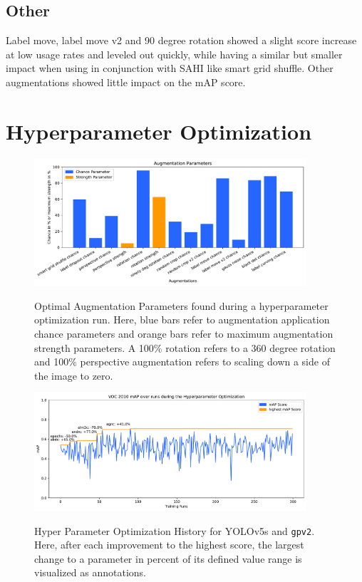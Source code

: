 \documentclass[10pt]{book}
\begin{document}
\subsection{Other} %

Label move, label move v2 and 90 degree rotation showed a slight score increase at low usage rates and leveled out quickly, while having a similar but smaller impact when using in conjunction with \ac{SAHI} like smart grid shuffle. Other augmentations showed little impact on the \ac{mAP} score.

\section{Hyperparameter Optimization}

\begin{figure}
  \caption{Optimal Augmentation Parameters found during a hyperparameter optimization run. Here, blue bars refer to augmentation application chance parameters and orange bars refer to maximum augmentation strength parameters. A 100\% rotation refers to a 360 degree rotation and 100\% perspective augmentation refers to scaling down a side of the image to zero.}
  \includegraphics[width=0.9\textwidth]{plot/best_hyp_run_params}
  \label{fig:optimal_augment_params} 
\end{figure} %

\begin{figure}
  \caption{Hyper Parameter Optimization History for \ac{YOLO}v5s and \texttt{gpv2}. Here, after each improvement to the highest score, the largest change to a parameter in percent of its defined value range is visualized as annotations.}
  \includegraphics[width=0.9\textwidth]{image/hyp-param-search-yolov5s-sahi-rc-fix-history}
  \label{fig:hyp_hist}
\end{figure}
\end{document}
